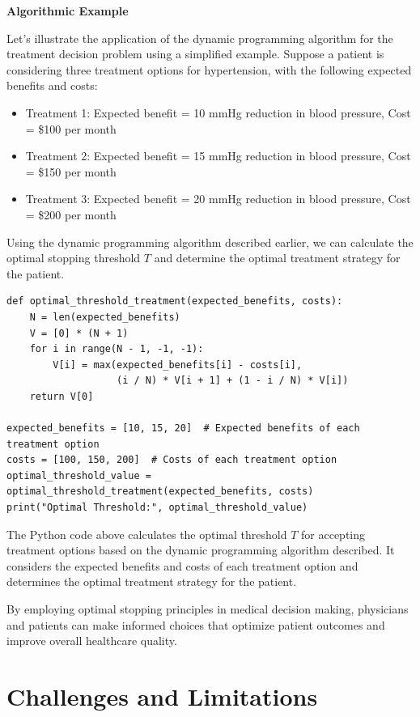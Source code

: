 \documentclass[12pt]{book} %
\begin{document}
\textbf{Algorithmic Example}

Let's illustrate the application of the dynamic programming algorithm for the treatment decision problem using a simplified example. Suppose a patient is considering three treatment options for hypertension, with the following expected benefits and costs:

\begin{itemize}
    \item Treatment 1: Expected benefit = 10 mmHg reduction in blood pressure, Cost = \$100 per month
    \item Treatment 2: Expected benefit = 15 mmHg reduction in blood pressure, Cost = \$150 per month
    \item Treatment 3: Expected benefit = 20 mmHg reduction in blood pressure, Cost = \$200 per month
\end{itemize}

Using the dynamic programming algorithm described earlier, we can calculate the optimal stopping threshold \(T\) and determine the optimal treatment strategy for the patient.

\FloatBarrier
\begin{lstlisting}
def optimal_threshold_treatment(expected_benefits, costs):
    N = len(expected_benefits)
    V = [0] * (N + 1)
    for i in range(N - 1, -1, -1):
        V[i] = max(expected_benefits[i] - costs[i], 
                   (i / N) * V[i + 1] + (1 - i / N) * V[i])
    return V[0]

expected_benefits = [10, 15, 20]  # Expected benefits of each treatment option
costs = [100, 150, 200]  # Costs of each treatment option
optimal_threshold_value = optimal_threshold_treatment(expected_benefits, costs)
print("Optimal Threshold:", optimal_threshold_value)
\end{lstlisting}
\FloatBarrier
The Python code above calculates the optimal threshold \(T\) for accepting treatment options based on the dynamic programming algorithm described. It considers the expected benefits and costs of each treatment option and determines the optimal treatment strategy for the patient.

By employing optimal stopping principles in medical decision making, physicians and patients can make informed choices that optimize patient outcomes and improve overall healthcare quality.



\section{Challenges and Limitations}
\end{document}
